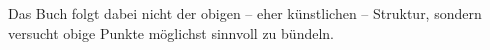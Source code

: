 Das Buch folgt dabei nicht der obigen -- eher künstlichen -- Struktur, sondern versucht obige Punkte möglichst sinnvoll zu bündeln.


% 
% 
% 
% 

